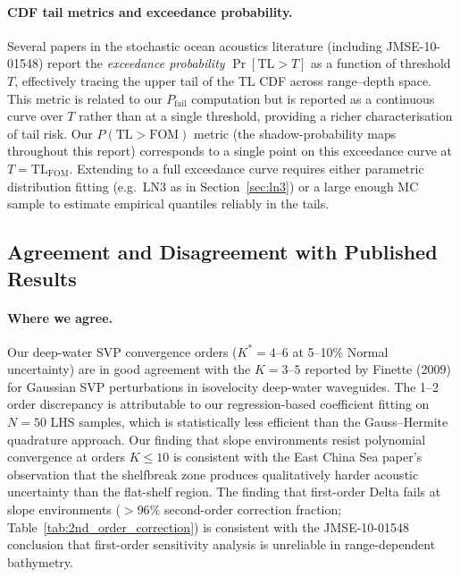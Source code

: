 \documentclass[11pt,a4paper]{article}
\newcommand{\TL}{\mathrm{TL}}
\begin{document}
\paragraph{CDF tail metrics and exceedance probability.}
Several papers in the stochastic ocean acoustics literature (including
JMSE-10-01548) report the \emph{exceedance probability}
$\Pr[\TL > T]$ as a function of threshold $T$, effectively tracing the upper tail
of the TL CDF across range--depth space.
This metric is related to our $P_\mathrm{fail}$ computation but is reported as a
continuous curve over $T$ rather than at a single threshold, providing a richer
characterisation of tail risk.
Our $P(\TL > \mathrm{FOM})$ metric (the shadow-probability maps throughout this
report) corresponds to a single point on this exceedance curve at $T = \TL_\text{FOM}$.
Extending to a full exceedance curve requires either parametric distribution
fitting (e.g.\ LN3 as in Section~\ref{sec:ln3}) or a large enough MC sample to
estimate empirical quantiles reliably in the tails.

\subsection{Agreement and Disagreement with Published Results}
\label{sec:agree_disagree}

\paragraph{Where we agree.}
Our deep-water SVP convergence orders ($K^* = 4$--$6$ at 5--10\% Normal uncertainty)
are in good agreement with the $K = 3$--$5$ reported by Finette (2009) for
Gaussian SVP perturbations in isovelocity deep-water waveguides.
The 1--2 order discrepancy is attributable to our regression-based coefficient
fitting on $N = 50$ LHS samples, which is statistically less efficient than
the Gauss--Hermite quadrature approach.
Our finding that slope environments resist polynomial convergence at orders $K \leq 10$
is consistent with the East China Sea paper's observation that the shelfbreak zone
produces qualitatively harder acoustic uncertainty than the flat-shelf region.
The finding that first-order Delta fails at slope environments ($> 96\%$
second-order correction fraction; Table~\ref{tab:2nd_order_correction}) is
consistent with the JMSE-10-01548 conclusion that first-order sensitivity analysis
is unreliable in range-dependent bathymetry.
\end{document}
